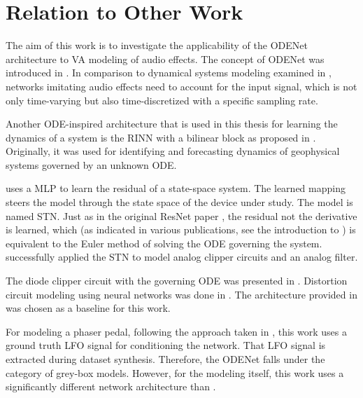 \section{Relation to Other Work}
\label{sec:relation_to_other_work}
The aim of this work is to investigate the applicability of the ODENet architecture to \ac{VA} modeling of audio effects. The concept of ODENet was introduced in \cite{Chen2018}. In comparison to dynamical systems modeling examined in \cite{Karlsson2019}, networks imitating audio effects need to account for the input signal, which is not only time-varying but also time-discretized with a specific sampling rate. 

Another \ac{ODE}-inspired architecture that is used in this thesis for learning the dynamics of a system is the \ac{RINN} with a bilinear block as proposed in \cite{Fablet2017,Ouala2019}. Originally, it was used for identifying and forecasting dynamics of geophysical systems governed by an unknown ODE.

\cite{Parker2019} uses a \ac{MLP} to learn the residual of a state-space system. The learned mapping steers the model through the state space of the device under study. The model is named \ac{STN}. Just as in the original \ac{ResNet} paper \cite{He2015}, the residual not the derivative is learned, which (as indicated in various publications, see the introduction to \cite{Chen2018}) is equivalent to the Euler method of solving the \ac{ODE} governing the system. \cite{Parker2019} successfully applied the \ac{STN} to model analog clipper circuits and an analog filter.

The diode clipper circuit with the governing \ac{ODE} was presented in \cite{Yeh2007,Yeh2008}. Distortion circuit modeling using neural networks was done in \cite{Wright2019,Wright2019a, Wrightetal2020}. The architecture provided in \cite{Wright2019} was chosen as a baseline for this work.

For modeling a phaser pedal, following the approach taken in \cite{Wright2020}, this work uses a ground truth \ac{LFO} signal for conditioning the network. That \ac{LFO} signal is extracted during dataset synthesis. Therefore, the ODENet falls under the category of grey-box models. However, for the modeling itself, this work uses a significantly different network architecture than \cite{Wright2020}.

